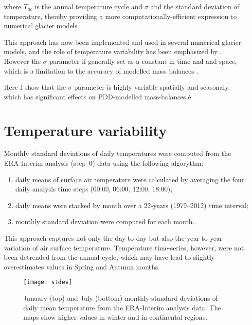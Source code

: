 \documentclass[twocolumn]{igs}
\begin{document}
where $T_{ac}$ is the annual temperature cycle and $\sigma$ and the standard deviation of temperature, thereby providing a more computationally-efficient expression to numerical glacier models.

This approach has now been implemented and used in several numerical glacier models, and the role of temperature variability has been emphasized by \citet{charbit-etal-2012}. However the $\sigma$ parameter if generally set as a constant in time and and space, which is a limitation to the accuracy of modelled mass balances \citep{charbit-etal-2012}.

Here I show that the $\sigma$ parameter is highly variable spatially and seasonaly, which has significant effects on PDD-modelled mass-balances.é


\section{Temperature variability}

Monthly standard deviations of daily temperatures were computed from the ERA-Interim\citep{data:erai} analysis (step~0) data using the following algorythm:

\begin{enumerate}
  \item daily means of surface air temperature were calculated by averaging the four daily analysis time steps (00:00, 06:00, 12:00, 18:00);
  \item daily means were stacked by month over a 22-years (1979--2012) time interval;
  \item monthly standard deviation were computed for each month.
\end{enumerate}

This approach captures not only the day-to-day but also the year-to-year variation of air surface temperature. Temperature time-series, however, were not been detrended from the annual cycle, which may have lead to slightly overestimates values in Spring and Autumn months.

\begin{figure}
  \centering\texttt{[image: stdev]}
  \caption{January (top) and July (bottom) monthly standard deviations of daily mean temperature from the ERA-Interim analysis data. The maps show higher values in winter and in continental regions.}
  \label{fig:stdev}
\end{figure}
\end{document}
